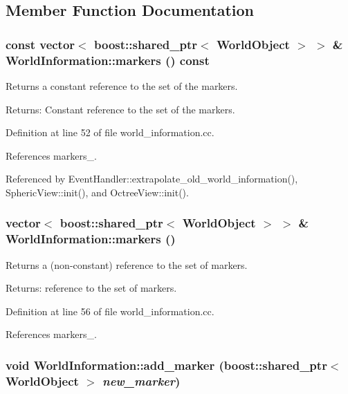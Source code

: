 \subsection{Member Function Documentation}
\hypertarget{class_world_information_de860e59ff258afc303720a171d1897e}{
\subsubsection[markers]{\setlength{\rightskip}{0pt plus 5cm}const vector$<$ boost::shared\_\-ptr$<$ {\bf WorldObject} $>$ $>$ \& WorldInformation::markers () const}}
\label{class_world_information_de860e59ff258afc303720a171d1897e}


Returns a constant reference to the set of the markers. \begin{Desc}
\item[Returns:]Constant reference to the set of the markers. \end{Desc}


Definition at line 52 of file world\_\-information.cc.

References markers\_\-.

Referenced by EventHandler::extrapolate\_\-old\_\-world\_\-information(), SphericView::init(), and OctreeView::init().\hypertarget{class_world_information_cff2c5c68d7c4dd999c462a0539eb2b2}{
\subsubsection[markers]{\setlength{\rightskip}{0pt plus 5cm}vector$<$ boost::shared\_\-ptr$<$ {\bf WorldObject} $>$ $>$ \& WorldInformation::markers ()}}
\label{class_world_information_cff2c5c68d7c4dd999c462a0539eb2b2}


Returns a (non-constant) reference to the set of markers. \begin{Desc}
\item[Returns:]reference to the set of markers. \end{Desc}


Definition at line 56 of file world\_\-information.cc.

References markers\_\-.\hypertarget{class_world_information_1da471aab9fcd304a6913b5b3568c66b}{
\subsubsection[add\_\-marker]{\setlength{\rightskip}{0pt plus 5cm}void WorldInformation::add\_\-marker (boost::shared\_\-ptr$<$ {\bf WorldObject} $>$ {\em new\_\-marker})}}
\label{class_world_information_1da471aab9fcd304a6913b5b3568c66b}


